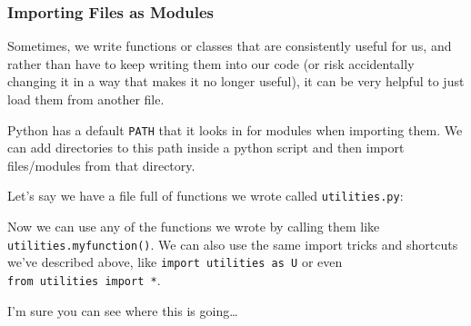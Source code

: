 \hypertarget{importing-files-as-modules}{%
\subsubsection{Importing Files as
Modules}\label{importing-files-as-modules}}

Sometimes, we write functions or classes that are consistently useful
for us, and rather than have to keep writing them into our code (or risk
accidentally changing it in a way that makes it no longer useful), it
can be very helpful to just load them from another file.

Python has a default \texttt{PATH} that it looks in for modules when
importing them. We can add directories to this path inside a python
script and then import files/modules from that directory.

Let's say we have a file full of functions we wrote called
\texttt{utilities.py}:

\begin{Shaded}
\begin{Highlighting}[]
\NormalTok{)}
\end{Highlighting}
\end{Shaded}

Now we can use any of the functions we wrote by calling them like
\texttt{utilities.myfunction()}. We can also use the same import tricks
and shortcuts we've described above, like
\texttt{import\ utilities\ as\ U} or even
\texttt{from\ utilities\ import\ *}.

I'm sure you can see where this is going\ldots{}

